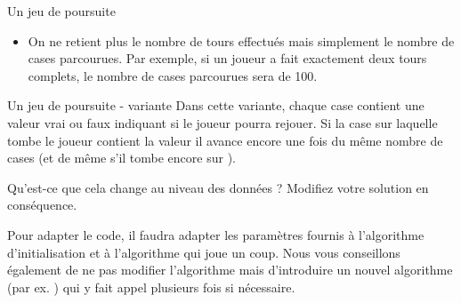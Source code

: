 \begin{Exercice}{Un jeu de poursuite}
\begin{enumerate}
\begin{itemize}
		\item
			On ne retient plus le nombre de tours effectués
			mais simplement le nombre de cases parcourues.
			Par exemple, si un joueur a fait exactement deux tours complets,
			le nombre de cases parcourues sera de 100.
			\begin{algo}
			\end{algo}
		\end{itemize}
	\end{enumerate}	
\end{Exercice}

\begin{Exercice}{Un jeu de poursuite - variante}
	Dans cette variante,
	chaque case contient une valeur vrai ou faux
	indiquant si le joueur pourra rejouer.
	Si la case sur laquelle tombe le joueur contient la valeur
	 il avance encore une fois du même nombre de cases 
	(et de même s’il tombe encore sur ).
	
	Qu'est-ce que cela change au niveau des données ?
	Modifiez votre solution en conséquence.
	
	Pour adapter le code,
	il faudra adapter les paramètres fournis à l'algorithme d'initialisation
	et à l'algorithme qui joue un coup.
	Nous vous conseillons également de ne pas modifier l'algorithme  
	mais d'introduire un nouvel algorithme (par ex. ) 
	qui y fait appel plusieurs fois si nécessaire.
\end{Exercice}

